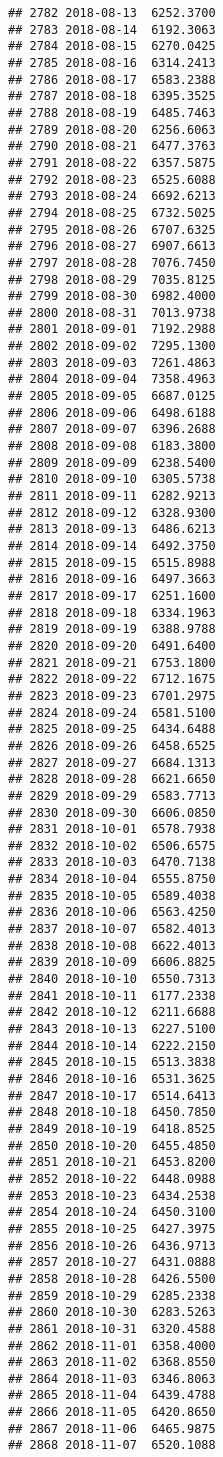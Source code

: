 \documentclass[
]{article}
\begin{document}
\begin{verbatim}
## 2782 2018-08-13  6252.3700
## 2783 2018-08-14  6192.3063
## 2784 2018-08-15  6270.0425
## 2785 2018-08-16  6314.2413
## 2786 2018-08-17  6583.2388
## 2787 2018-08-18  6395.3525
## 2788 2018-08-19  6485.7463
## 2789 2018-08-20  6256.6063
## 2790 2018-08-21  6477.3763
## 2791 2018-08-22  6357.5875
## 2792 2018-08-23  6525.6088
## 2793 2018-08-24  6692.6213
## 2794 2018-08-25  6732.5025
## 2795 2018-08-26  6707.6325
## 2796 2018-08-27  6907.6613
## 2797 2018-08-28  7076.7450
## 2798 2018-08-29  7035.8125
## 2799 2018-08-30  6982.4000
## 2800 2018-08-31  7013.9738
## 2801 2018-09-01  7192.2988
## 2802 2018-09-02  7295.1300
## 2803 2018-09-03  7261.4863
## 2804 2018-09-04  7358.4963
## 2805 2018-09-05  6687.0125
## 2806 2018-09-06  6498.6188
## 2807 2018-09-07  6396.2688
## 2808 2018-09-08  6183.3800
## 2809 2018-09-09  6238.5400
## 2810 2018-09-10  6305.5738
## 2811 2018-09-11  6282.9213
## 2812 2018-09-12  6328.9300
## 2813 2018-09-13  6486.6213
## 2814 2018-09-14  6492.3750
## 2815 2018-09-15  6515.8988
## 2816 2018-09-16  6497.3663
## 2817 2018-09-17  6251.1600
## 2818 2018-09-18  6334.1963
## 2819 2018-09-19  6388.9788
## 2820 2018-09-20  6491.6400
## 2821 2018-09-21  6753.1800
## 2822 2018-09-22  6712.1675
## 2823 2018-09-23  6701.2975
## 2824 2018-09-24  6581.5100
## 2825 2018-09-25  6434.6488
## 2826 2018-09-26  6458.6525
## 2827 2018-09-27  6684.1313
## 2828 2018-09-28  6621.6650
## 2829 2018-09-29  6583.7713
## 2830 2018-09-30  6606.0850
## 2831 2018-10-01  6578.7938
## 2832 2018-10-02  6506.6575
## 2833 2018-10-03  6470.7138
## 2834 2018-10-04  6555.8750
## 2835 2018-10-05  6589.4038
## 2836 2018-10-06  6563.4250
## 2837 2018-10-07  6582.4013
## 2838 2018-10-08  6622.4013
## 2839 2018-10-09  6606.8825
## 2840 2018-10-10  6550.7313
## 2841 2018-10-11  6177.2338
## 2842 2018-10-12  6211.6688
## 2843 2018-10-13  6227.5100
## 2844 2018-10-14  6222.2150
## 2845 2018-10-15  6513.3838
## 2846 2018-10-16  6531.3625
## 2847 2018-10-17  6514.6413
## 2848 2018-10-18  6450.7850
## 2849 2018-10-19  6418.8525
## 2850 2018-10-20  6455.4850
## 2851 2018-10-21  6453.8200
## 2852 2018-10-22  6448.0988
## 2853 2018-10-23  6434.2538
## 2854 2018-10-24  6450.3100
## 2855 2018-10-25  6427.3975
## 2856 2018-10-26  6436.9713
## 2857 2018-10-27  6431.0888
## 2858 2018-10-28  6426.5500
## 2859 2018-10-29  6285.2338
## 2860 2018-10-30  6283.5263
## 2861 2018-10-31  6320.4588
## 2862 2018-11-01  6358.4000
## 2863 2018-11-02  6368.8550
## 2864 2018-11-03  6346.8063
## 2865 2018-11-04  6439.4788
## 2866 2018-11-05  6420.8650
## 2867 2018-11-06  6465.9875
## 2868 2018-11-07  6520.1088

\end{verbatim}
\end{document}
